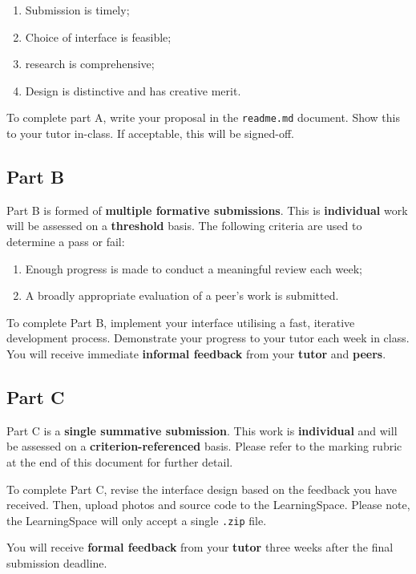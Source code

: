 \documentclass{../../fal_assignment}
\begin{document}
\begin{enumerate}[label=(\alph*)]
	\item Submission is timely;
	\item Choice of interface is feasible;
	\item research is comprehensive;
	\item Design is distinctive and has creative merit.
\end{enumerate}

To complete part A, write your proposal in the \texttt{readme.md} document. Show this to your tutor in-class. If acceptable, this will be signed-off.

\subsection*{Part B}

Part B is formed of \textbf{multiple formative submissions}. This is \textbf{individual} work will be assessed on a \textbf{threshold} basis. The following criteria are used to determine a pass or fail:

\begin{enumerate}[label=(\alph*)]
	\item Enough progress is made to conduct a meaningful review each week;
	\item A broadly appropriate evaluation of a peer's work is submitted.
\end{enumerate}

To complete Part B, implement your interface utilising a fast, iterative development process. Demonstrate your progress to your tutor each week in class. You will receive immediate \textbf{informal feedback} from your \textbf{tutor} and \textbf{peers}.

\subsection*{Part C}

Part C is a \textbf{single summative submission}. This work is \textbf{individual} and will be assessed on a \textbf{criterion-referenced} basis. Please refer to the marking rubric at the end of this document for further detail.

To complete Part C, revise the interface design based on the feedback you have received. Then, upload photos and source code to the LearningSpace. Please note, the LearningSpace will only accept a single \texttt{.zip} file.

You will receive \textbf{formal feedback} from your \textbf{tutor} three weeks after the final submission deadline.
\end{document}
